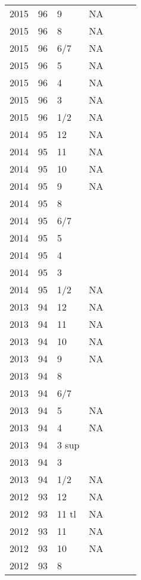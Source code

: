\begin{longtable}{ |l|l|l|l|p{2.7cm}|l|p{2cm}| }
 2015 & 96 &     9 &      NA &  &  & \\
 2015 & 96 &     8 &      NA &  &  & \\
 2015 & 96 &   6/7 &      NA  &  &  & \\
 2015 & 96 &     5 &      NA &  &  & \\
 2015 & 96 &     4 &      NA &  &  & \\
 2015 & 96 &     3 &      NA &  &  & \\
 2015 & 96 &   1/2 &      NA &  &  & \\
 2014 & 95 &    12 &      NA &  &  & \\
 2014 & 95 &    11 &      NA &  &  & \\
 2014 & 95 &    10 &      NA &  &  & \\
 2014 & 95 &     9 &      NA &  &  & \\
 2014 & 95 &     8 &         &  &  & \\
 2014 & 95 &   6/7 &         &  &  & \\
 2014 & 95 &     5 &         &  &  & \\
 2014 & 95 &     4 &         &  &  & \\
 2014 & 95 &     3 &         &  &  & \\
 2014 & 95 &   1/2 &    NA   &  &  & \\
 2013 & 94 &    12 &    NA   &  &   & \\
 2013 & 94 &    11 &    NA   &  &  & \\
 2013 & 94 &    10 &    NA   &  &  & \\
 2013 & 94 &     9 &    NA   &  &  & \\
 2013 & 94 &     8 &         &  &  & \\
 2013 & 94 &   6/7 &         &  &  & \\
 2013 & 94 &     5 &    NA   &  &  & \\
 2013 & 94 &     4 &    NA   &  &  & \\
 2013 & 94 & 3 sup &         &  &  & \\
 2013 & 94 &     3 &         &  &  & \\
 2013 & 94 &   1/2 &    NA   &  &  & \\
 2012 & 93 &    12 &    NA   &  &  & \\
 2012 & 93 & 11 tl &    NA   &  &  & \\
 2012 & 93 & 11    &    NA   &  &  & \\
 2012 & 93 & 10    &    NA   &  &   & \\
 2012 & 93 & 8     &         &  &  & \\

\end{longtable}
